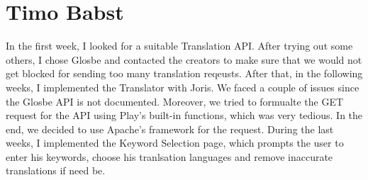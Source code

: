 \section{Timo Babst}

In the first week, I looked for a suitable Translation API. After trying out some others, I chose Glosbe and contacted the creators to make sure
that we would not get blocked for sending too many translation reqeusts. After that, in the following weeks, I implemented the Translator with Joris.
We faced a couple of issues since the Glosbe API is not documented. Moreover, we tried to formualte the GET request for the API using
Play's built-in functions, which was very tedious. In the end, we decided to use Apache's framework for the request.
During the last weeks, I implemented the Keyword Selection page, which prompts the user to enter his keywords, choose his tranlsation languages and remove
inaccurate translations if need be.




